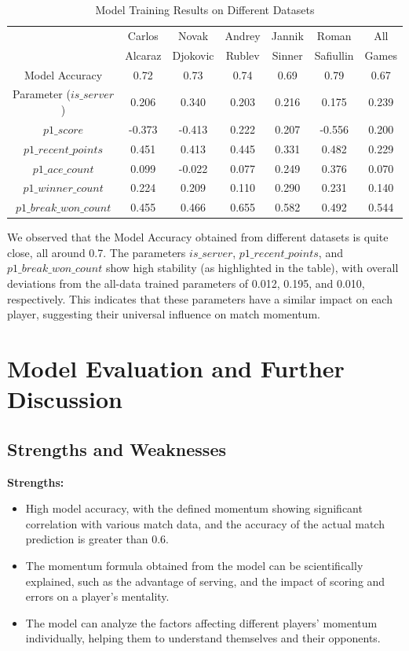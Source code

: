 \documentclass[UTF8]{ctexart} %
\begin{document}
\begin{table}[H]
    \caption{Model Training Results on Different Datasets}
    \centering
    \begin{tabular}{|c|c|c|c|c|c|c|}
    \hline
     & Carlos & Novak & Andrey & Jannik & Roman & All \\
     & Alcaraz & Djokovic & Rublev & Sinner & Safiullin & Games \\ \hline 
    Model Accuracy & 0.72 & 0.73 & 0.74 & 0.69 & 0.79 & 0.67 \\ \hline
    Parameter (\(is\_server\)) & 0.206 & 0.340 & 0.203 & 0.216 & 0.175 & 0.239 \\ \hline
    \(p1\_score\) & -0.373 & -0.413 & 0.222 & 0.207 & -0.556 & 0.200 \\ \hline
    \(p1\_recent\_points\) & 0.451 & 0.413 & 0.445 & 0.331 & 0.482 & 0.229 \\ \hline
    \(p1\_ace\_count\) & 0.099 & -0.022 & 0.077 & 0.249 & 0.376 & 0.070 \\ \hline
    \(p1\_winner\_count\) & 0.224 & 0.209 & 0.110 & 0.290 & 0.231 & 0.140 \\ \hline
    \(p1\_break\_won\_count\) & 0.455 & 0.466 & 0.655 & 0.582 & 0.492 & 0.544 \\ \hline
    \end{tabular}
\end{table}

We observed that the Model Accuracy obtained from different datasets is quite close, all around 0.7. 
The parameters \(is\_server\), \(p1\_recent\_points\), and \(p1\_break\_won\_count\) show high 
stability (as highlighted in the table), with overall deviations from the all-data trained parameters 
of 0.012, 0.195, and 0.010, respectively. This indicates that these parameters have a similar impact 
on each player, suggesting their universal influence on match momentum.

\section{\textbf{Model Evaluation and Further Discussion}}
\subsection{\textbf{Strengths and Weaknesses}}

\noindent\textbf{Strengths:}
\begin{itemize}
    \item High model accuracy, with the defined momentum showing significant correlation with various 
    match data, and the accuracy of the actual match prediction is greater than 0.6.
    \item The momentum formula obtained from the model can be scientifically explained, such as the 
    advantage of serving, and the impact of scoring and errors on a player's mentality.
    \item The model can analyze the factors affecting different players' momentum individually, 
    helping them to understand themselves and their opponents.
\end{itemize}
\end{document}
